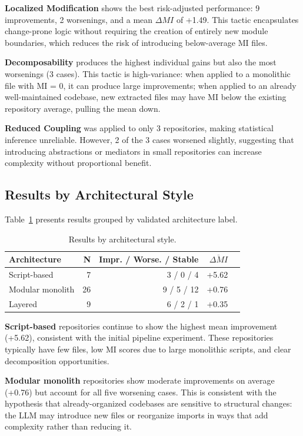\documentclass[sigconf,review,anonymous]{acmart}
\begin{document}
\textbf{Localized Modification} shows the best risk-adjusted performance: 9 improvements, 2 worsenings, and a mean $\Delta MI$ of +1.49. This tactic encapsulates change-prone logic without requiring the creation of entirely new module boundaries, which reduces the risk of introducing below-average MI files.

\textbf{Decomposability} produces the highest individual gains but also the most worsenings (3 cases). This tactic is high-variance: when applied to a monolithic file with MI = 0, it can produce large improvements; when applied to an already well-maintained codebase, new extracted files may have MI below the existing repository average, pulling the mean down.

\textbf{Reduced Coupling} was applied to only 3 repositories, making statistical inference unreliable. However, 2 of the 3 cases worsened slightly, suggesting that introducing abstractions or mediators in small repositories can increase complexity without proportional benefit.

\subsection{Results by Architectural Style}

Table~\ref{tab:exp5_arch} presents results grouped by validated architecture label.

\begin{table}[H]
\centering
\small
\caption{Results by architectural style.}
\label{tab:exp5_arch}
\begin{tabular}{lrrrr}
\toprule
\textbf{Architecture} & \textbf{N} & \textbf{Impr. / Worse. / Stable} & $\overline{\Delta MI}$ \\
\midrule
Script-based     & 7  & 3 / 0 / 4 & +5.62 \\
Modular monolith & 26 & 9 / 5 / 12 & +0.76 \\
Layered          & 9  & 6 / 2 / 1 & +0.35 \\
\bottomrule
\end{tabular}
\end{table}

\textbf{Script-based} repositories continue to show the highest mean improvement (+5.62), consistent with the initial pipeline experiment. These repositories typically have few files, low MI scores due to large monolithic scripts, and clear decomposition opportunities.

\textbf{Modular monolith} repositories show moderate improvements on average (+0.76) but account for all five worsening cases. This is consistent with the hypothesis that already-organized codebases are sensitive to structural changes: the LLM may introduce new files or reorganize imports in ways that add complexity rather than reducing it.
\end{document}
